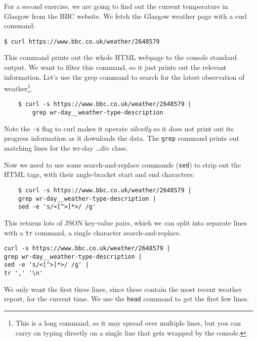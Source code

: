 \documentclass{article}
\begin{document}
For a second exercise, we are going to find out the current temperature in Glasgow from the BBC website.
We fetch the Glasgow weather page with a curl command:

\begin{lstlisting}[style=BashInputStyle]
    $ curl https://www.bbc.co.uk/weather/2648579
\end{lstlisting}

This command prints out the whole HTML webpage to the console standard output. We want to filter this command, so it just prints out the relevant information. Let's use the grep command to search for the latest observation of weather\footnote{This is a long command, so it may spread over multiple lines, but you can carry on typing directly on a single line that gets wrapped by the console.}.

\begin{verbatim}
    $ curl -s https://www.bbc.co.uk/weather/2648579 | 
        grep wr-day__weather-type-description 
\end{verbatim}

Note the \texttt{-s} flag to curl makes it operate \textit{silently} so it does not print out its progress information as it downloads the data. The \texttt{grep} command prints out matching lines for the wr-day \ldots div class.

Now we need to use some search-and-replace commands (\texttt{sed}) to strip out the HTML tags, with their angle-bracket start and end characters:

\begin{verbatim}
    $ curl -s https://www.bbc.co.uk/weather/2648579 | 
    grep wr-day__weather-type-description |
    sed -e 's/<[^>]*>/ /g'
\end{verbatim}


This returns lots of JSON key-value pairs, which we can split into separate lines with a \texttt{tr} command, a single character search-and-replace.

\begin{verbatim}
curl -s https://www.bbc.co.uk/weather/2648579 | 
grep wr-day__weather-type-description |  
sed -e 's/<[^>]*>/ /g' | 
tr ',' '\n'
\end{verbatim}

We only want the first three lines, since these contain the most recent weather report, for the current time. We use the \texttt{head} command to get the first few lines.
\end{document}
